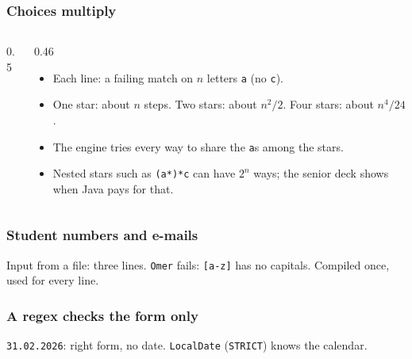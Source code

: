 \documentclass[aspectratio=169,10pt,compress]{beamer}
\begin{document}
\begin{frame}[t,fragile] \frametitle{Choices multiply}
  \begin{columns}[T]
    \begin{column}{0.5\textwidth}
    \end{column}
    \begin{column}{0.46\textwidth}
      \begin{itemize}\small
        \item Each line: a failing match on $n$ letters \texttt{a} (no \texttt{c}).
        \item One star: about $n$ steps. Two stars: about $n^{2}/2$. Four stars: about $n^{4}/24$.
        \item The engine tries every way to share the \texttt{a}s among the stars.
        \item Nested stars such as \texttt{(a*)*c} can have $2^{n}$ ways; the senior deck shows when Java pays for that.
      \end{itemize}
    \end{column}
  \end{columns}
\end{frame}





\begin{frame}[t,fragile] \frametitle{Student numbers and e-mails}

  \vspace{0.2em}
  \small Input from a file: three lines. \texttt{Omer} fails: \texttt{[a-z]} has no capitals. Compiled once, used for every line.
\end{frame}





\begin{frame}[t,fragile] \frametitle{A regex checks the form only}

  \vspace{0.2em}
  \small \texttt{31.02.2026}: right form, no date. \texttt{LocalDate} (\texttt{STRICT}) knows the calendar.
\end{frame}
\end{document}
